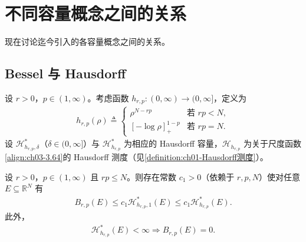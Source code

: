 \documentclass[../../main.tex]{subfiles}%
\begin{document}
\section{不同容量概念之间的关系}\label{section:ch03-容量关系}

现在讨论迄今引入的各容量概念之间的关系。

\subsection{Bessel 与 Hausdorff}\label{subsection:ch03-BesselHausdorff}

设 $r>0$，$p\in(1,\infty)$。考虑函数 $h_{r,p}:(0,\infty)\to(0,\infty]$，定义为
\begin{align}
h_{r,p}(\rho)\triangleq \begin{cases}
\rho^{N-rp} & \text{若 }rp<N,\\
[-\log\rho]_+^{1-p} & \text{若 }rp=N.
\end{cases}
\label{align:ch03-3.64}
\end{align}
设 $\mathcal{H}^*_{h_{r,p},\delta}$（$\delta\in(0,\infty]$）与 $\mathcal{H}^*_{h_{r,p}}$ 为相应的 Hausdorff 容量，$\mathcal{H}_{h_{r,p}}$ 为关于尺度函数\eqref{align:ch03-3.64}的 Hausdorff 测度（见\cref{definition:ch01-Hausdorff测度}）。

\begin{proposition}\label{proposition:ch03-BesselHausdorff上界}
设 $r>0$，$p\in(1,\infty)$ 且 $rp\leqslant N$。则存在常数 $c_1>0$（依赖于 $r,p,N$）使对任意 $E\subseteq\mathbb{R}^N$ 有
\begin{align}
B_{r,p}(E)\leqslant c_1\mathcal{H}^*_{h_{r,p},1}(E)\leqslant c_1\mathcal{H}^*_{h_{r,p}}(E).\label{align:ch03-3.65}
\end{align}
此外，
\begin{align}
\mathcal{H}^*_{h_{r,p}}(E)<\infty\Rightarrow B_{r,p}(E)=0.\label{align:ch03-3.66}
\end{align}
\end{proposition}
\end{document}
